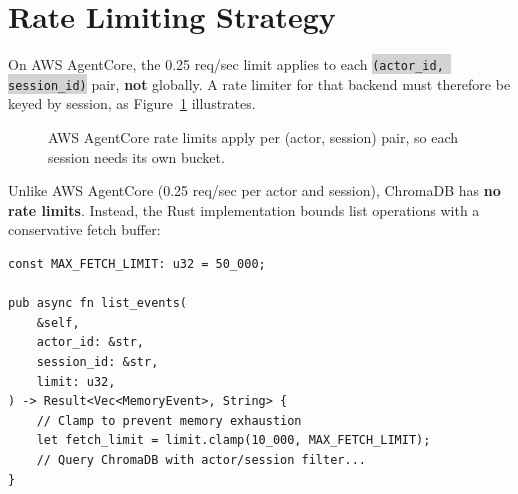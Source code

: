 \documentclass[11pt,letterpaper]{article}
\newcommand{\code}[1]{\texttt{\small\colorbox{lightgray}{#1}}}
\begin{document}
\section{Rate Limiting Strategy}

\begin{keybox}
On AWS AgentCore, the 0.25 req/sec limit applies to each \code{(actor\_id, session\_id)} pair, \textbf{not} globally. A rate limiter for that backend must therefore be keyed by session, as Figure~\ref{fig:ratelimit} illustrates.
\end{keybox}

\begin{figure}[!htbp]
\centering
{}
\caption{AWS AgentCore rate limits apply per (actor, session) pair, so each session needs its own bucket.}\label{fig:ratelimit}
\end{figure}

\begin{infobox}
Unlike AWS AgentCore (0.25 req/sec per actor and session), ChromaDB has \textbf{no rate limits}. Instead, the Rust implementation bounds list operations with a conservative fetch buffer:
\end{infobox}

\begin{lstlisting}[caption={Fetch buffer for list operations (Rust)}]
const MAX_FETCH_LIMIT: u32 = 50_000;

pub async fn list_events(
    &self,
    actor_id: &str,
    session_id: &str,
    limit: u32,
) -> Result<Vec<MemoryEvent>, String> {
    // Clamp to prevent memory exhaustion
    let fetch_limit = limit.clamp(10_000, MAX_FETCH_LIMIT);
    // Query ChromaDB with actor/session filter...
}
\end{lstlisting}
\end{document}

